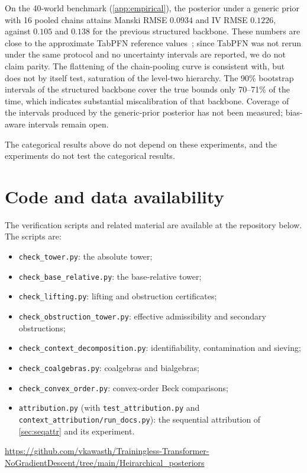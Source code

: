 \documentclass[11pt]{article}
\theoremstyle{definition}
\theoremstyle{remark}
\begin{document}
On the 40-world benchmark (\cref{app:empirical}), the posterior under a generic prior with 16 pooled
chains attains Manski RMSE $0.0934$ and IV RMSE $0.1226$, against $0.105$ and $0.138$ for the
previous structured backbone. These numbers are close to the approximate TabPFN reference
values~\cite{Hollmann2023}; since TabPFN was not rerun under the same protocol and no uncertainty
intervals are reported, we do not claim parity. The flattening of the chain-pooling curve is
consistent with, but does not by itself test, saturation of the level-two hierarchy. The 90\%
bootstrap intervals of the structured backbone cover the true bounds only 70--71\% of the time, which
indicates substantial miscalibration of that backbone. Coverage of the intervals produced by the
generic-prior posterior has not been measured; bias-aware intervals remain open.

The categorical results above do not depend on these experiments, and the experiments do not test
the categorical results.

\section{Code and data availability}

The verification scripts and related material are available at the repository below. The scripts
are:
\begin{itemize}[leftmargin=*,nosep]
\item \texttt{check\_tower.py}: the absolute tower;
\item \texttt{check\_base\_relative.py}: the base-relative tower;
\item \texttt{check\_lifting.py}: lifting and obstruction certificates;
\item \texttt{check\_obstruction\_tower.py}: effective admissibility and secondary obstructions;
\item \texttt{check\_context\_decomposition.py}: identifiability, contamination and sieving;
\item \texttt{check\_coalgebras.py}: coalgebras and bialgebras;
\item \texttt{check\_convex\_order.py}: convex-order Beck comparisons;
\item \texttt{attribution.py} (with \texttt{test\_attribution.py} and \texttt{context\_attribution/run\_docs.py}): the sequential attribution of \cref{sec:seqattr} and its experiment.
\end{itemize}
\begin{center}\small\url{https://github.com/vkawasth/Trainingless-Transformer-NoGradientDescent/tree/main/Heirarchical_posteriors}\end{center}
\end{document}
